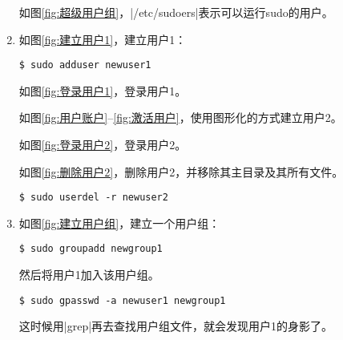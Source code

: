 \documentclass[cs4size,a4paper,nofonts]{ctexart}
\begin{document}
\begin{enumerate}
如图\ref{fig:超级用户组}，|/etc/sudoers|表示可以运行sudo的用户。

\begin{figure}[htp]
\end{figure}

\begin{figure}[htp]
\end{figure}

\item 如图\ref{fig:建立用户1}，建立用户1：
\begin{Verbatim}
$ sudo adduser newuser1
\end{Verbatim}

如图\ref{fig:登录用户1}，登录用户1。

如图\ref{fig:用户账户}--\ref{fig:激活用户}，使用图形化的方式建立用户2。

如图\ref{fig:登录用户2}，登录用户2。

如图\ref{fig:删除用户2}，删除用户2，并移除其主目录及其所有文件。
\begin{Verbatim}
$ sudo userdel -r newuser2
\end{Verbatim}

\begin{figure}[htp]
\end{figure}

\begin{figure}[htp]
\end{figure}

\begin{figure}[htp]
\end{figure}

\begin{figure}[htp]
\end{figure}

\item 如图\ref{fig:建立用户组}，建立一个用户组：
\begin{Verbatim}
$ sudo groupadd newgroup1
\end{Verbatim}
然后将用户1加入该用户组。
\begin{Verbatim}
$ sudo gpasswd -a newuser1 newgroup1
\end{Verbatim}
这时候用|grep|再去查找用户组文件，就会发现用户1的身影了。


\end{enumerate}
\end{document}
